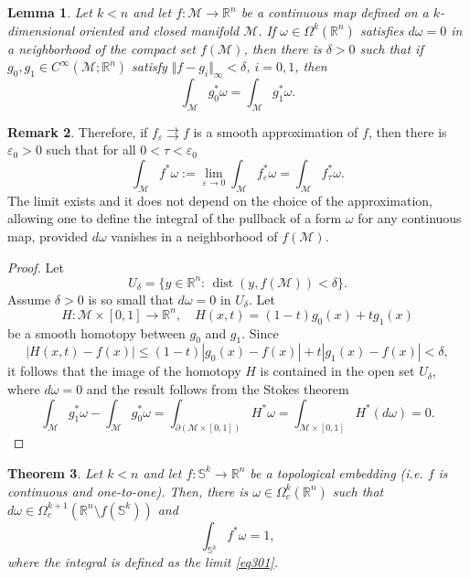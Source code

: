 \documentclass[intlimits,12pt,reqno]{amsart}
\newcommand{\cM}{\mathcal M}
\newcommand{\Sph}{\mathbb S}
\newcommand{\R}{\mathbb R}
\newcommand{\eps}{\varepsilon}
\numberwithin{equation}{section}
\def\dist{\operatorname{dist}}
\newtheorem{theorem}{Theorem}[section]
\newtheorem{lemma}[theorem]{Lemma}
\theoremstyle{definition}
\newtheorem{remark}[theorem]{Remark}
\begin{document}
\begin{lemma}
\label{T20}
Let $k<n$ and let $f:\cM\to\R^n$ be a continuous map defined on a $k$-dimensional oriented and closed manifold $\cM$. If $\omega\in \Omega^k(\R^n)$ satisfies $d\omega=0$ in a neighborhood of the compact set $f(\cM)$, then there is $\delta>0$ such that if 
$g_0,g_1\in C^\infty(\cM;\R^n)$ satisfy $\Vert f-g_i\Vert_\infty<\delta$, $i=0,1$, then
$$
\int_{\cM} g_0^*\omega=\int_{\cM} g_1^*\omega.
$$
\end{lemma}
\begin{remark}
\label{R2}
Therefore, if $f_\eps\rightrightarrows f$ is a smooth approximation of $f$, then 
there is $\eps_0>0$ such that for all $0<\tau<\eps_0$
\begin{equation}
\label{eq301}
\int_{\cM} f^*\omega:=\lim_{\eps\to 0}\int_{\cM} f^*_\eps\omega=
\int_{\cM} f_\tau^*\omega.
\end{equation}
The limit exists and it does not depend on the choice of the approximation, allowing one to define the integral of the pullback of a form $\omega$ for any continuous map, provided $d\omega$ vanishes in a neighborhood of $f(\cM)$.
\end{remark}
\begin{proof}
Let
$$
U_\delta=\{y\in\R^n:\, \dist(y,f(\cM))<\delta\}.
$$
Assume $\delta>0$ is so small that $d\omega=0$ in $U_\delta$. Let
$$
H:\cM\times [0,1]\to\R^n,
\quad
H(x,t)=(1-t)g_0(x)+tg_1(x)
$$
be a smooth homotopy between $g_0$ and $g_1$. Since
$$
|H(x,t)-f(x)|\leq (1-t)|g_0(x)-f(x)|+t|g_1(x)-f(x)|<\delta,
$$
it follows that the image of the homotopy $H$ is contained in the open set $U_\delta$, where $d\omega=0$ and the result follows from the Stokes theorem
$$
\int_{\cM}g_1^*\omega-\int_{\cM}g_0^*\omega=
\int_{\partial(\cM\times[0,1])}H^*\omega=\int_{\cM\times [0,1]} H^*(d\omega)=0.
$$
\end{proof}
\begin{theorem}
\label{T21}
Let $k<n$ and let $f:\Sph^k\to\R^n$ be a topological embedding (i.e. $f$ is continuous and one-to-one). Then, there is $\omega\in \Omega^k_c(\R^n)$ such that
$d\omega\in\Omega_c^{k+1}(\R^n\setminus f(\Sph^k))$ and
\begin{equation}
\label{eq302}
\int_{\Sph^k} f^*\omega=1,
\end{equation}
where the integral is defined as the limit \eqref{eq301}.
\end{theorem}
\end{document}
